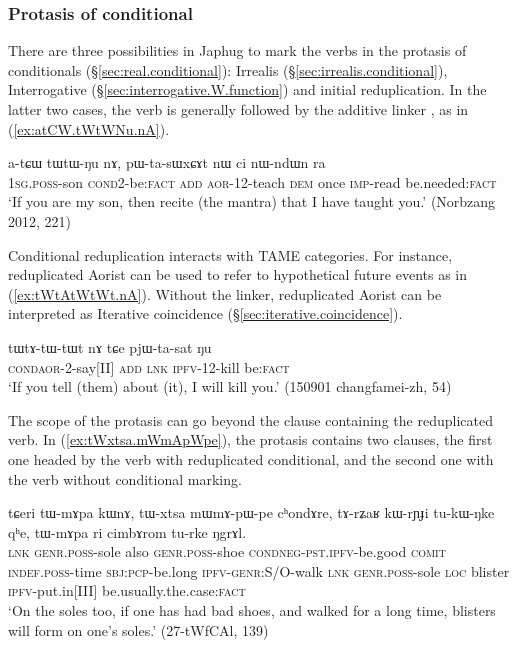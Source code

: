\subsubsection{Protasis of conditional} \label{sec:redp.protasis}
There are three possibilities in Japhug to mark the verbs in the protasis of conditionals (§\ref{sec:real.conditional}): Irrealis (§\ref{sec:irrealis.conditional}), Interrogative  (§\ref{sec:interrogative.W.function}) and initial reduplication. In the latter two cases, the verb is generally followed by the additive linker , as in (\ref{ex:atCW.tWtWNu.nA}).
 
\begin{exe}
\ex \label{ex:atCW.tWtWNu.nA}
\gll   a-tɕɯ tɯ\redp{}tɯ-ŋu nɤ, pɯ-ta-sɯxɕɤt nɯ ci nɯ-ndɯn ra \\
\textsc{1sg}.\textsc{poss}-son \textsc{cond}\redp{}2-be:\textsc{fact} \textsc{add} \textsc{aor}-1\fl{}2-teach \textsc{dem} once \textsc{imp}-read be.needed:\textsc{fact} \\
\glt `If you are my son, then recite (the mantra) that I have taught you.' (Norbzang 2012, 221)
\end{exe}

Conditional reduplication interacts with TAME categories. For instance, reduplicated Aorist can be used to refer to hypothetical future events as in (\ref{ex:tWtAtWtWt.nA}). Without the  linker, reduplicated Aorist can be interpreted as Iterative coincidence (§\ref{sec:iterative.coincidence}).

\begin{exe}
\ex \label{ex:tWtAtWtWt.nA}
\gll tɯ\redp{}tɤ-tɯ-tɯt nɤ tɕe pjɯ-ta-sat ŋu \\
\textsc{cond}\redp{}\textsc{aor}-2-say[II] \textsc{add} \textsc{lnk} \textsc{ipfv}-1\fl{}2-kill be:\textsc{fact} \\
\glt `If you tell (them) about (it), I will kill you.' (150901 changfamei-zh, 54)
\end{exe}

The scope of the protasis can go beyond the clause containing the reduplicated verb. In (\ref{ex:tWxtsa.mWmApWpe}), the protasis contains two clauses, the first one headed by the verb  with reduplicated conditional, and the second one with the verb  without conditional marking.

\begin{exe}
\ex \label{ex:tWxtsa.mWmApWpe}
\gll tɕeri tɯ-mɤpa kɯnɤ, tɯ-xtsa mɯ\redp{}mɤ-pɯ-pe cʰondɤre,  tɤ-rʑaʁ kɯ-rɲɟi tu-kɯ-ŋke qʰe, tɯ-mɤpa ri cimbɤrom tu-rke ŋgrɤl. \\
\textsc{lnk} \textsc{genr}.\textsc{poss}-sole also \textsc{genr}.\textsc{poss}-shoe \textsc{cond}\redp{}\textsc{neg}-\textsc{pst}.\textsc{ipfv}-be.good  \textsc{comit} \textsc{indef}.\textsc{poss}-time \textsc{sbj}:\textsc{pcp}-be.long \textsc{ipfv}-\textsc{genr}:S/O-walk \textsc{lnk} \textsc{genr}.\textsc{poss}-sole \textsc{loc} blister \textsc{ipfv}-put.in[III] be.usually.the.case:\textsc{fact} \\
\glt `On the soles too, if one has had bad shoes, and walked for a long time, blisters will form on one's soles.' (27-tWfCAl, 139)
\end{exe}


